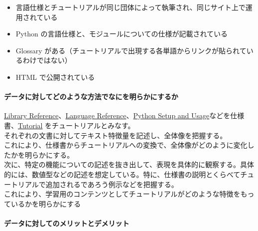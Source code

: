 \begin{itemize}
\tightlist
\item
  言語仕様とチュートリアルが同じ団体によって執筆され、同じサイト上で運用されている
\item
  Python の言語仕様と、モジュールについての仕様が記載されている
\item
  Glossary
  がある（チュートリアルで出現する各単語からリンクが貼られているわけではない）
\item
  HTML で公開されている
\end{itemize}

\hypertarget{ux30c7ux30fcux30bfux306bux5bfeux3057ux3066ux3069ux306eux3088ux3046ux306aux65b9ux6cd5ux3067ux306aux306bux3092ux660eux3089ux304bux306bux3059ux308bux304b-2}{%
\paragraph{データに対してどのような方法でなにを明らかにするか}\label{ux30c7ux30fcux30bfux306bux5bfeux3057ux3066ux3069ux306eux3088ux3046ux306aux65b9ux6cd5ux3067ux306aux306bux3092ux660eux3089ux304bux306bux3059ux308bux304b-2}}

\href{https://docs.python.org/3/library/index.html}{Library
Reference}、\href{https://docs.python.org/3/reference/index.html}{Language
Reference}、\href{https://docs.python.org/3/using/index.html}{Python
Setup and
Usage}などを仕様書、\href{https://docs.python.org/3/tutorial/index.html}{Tutorial}
をチュートリアルとみなす。\\
それぞれの文書に対してテキスト特徴量を記述し、全体像を把握する。\\
これにより、仕様書からチュートリアルへの変換で、全体像がどのように変化したかを明らかにする。\\
次に、特定の機能についての記述を抜き出して、表現を具体的に観察する。具体的には、数値型などの記述を想定している。特に、仕様書の説明とくらべてチュートリアルで追加されるであろう例示などを把握する。\\
これにより、学習用のコンテンツとしてチュートリアルがどのような特徴をもっているかを明らかにする

\hypertarget{ux30c7ux30fcux30bfux306bux5bfeux3057ux3066ux306eux30e1ux30eaux30c3ux30c8ux3068ux30c7ux30e1ux30eaux30c3ux30c8-2}{%
\paragraph{データに対してのメリットとデメリット}\label{ux30c7ux30fcux30bfux306bux5bfeux3057ux3066ux306eux30e1ux30eaux30c3ux30c8ux3068ux30c7ux30e1ux30eaux30c3ux30c8-2}}

